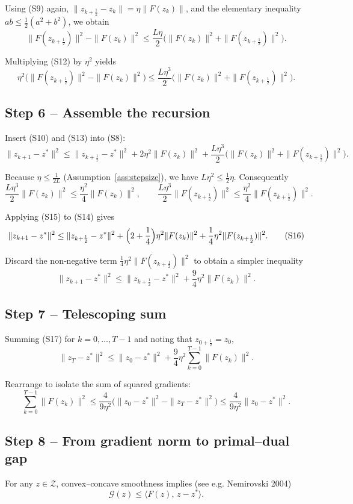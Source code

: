 \documentclass{article}
\begin{document}
Using (S9) again, $\|z_{k+\frac12}-z_{k}\|=\eta\|F(z_{k})\|$, and the elementary inequality
$ab\le\frac12(a^{2}+b^{2})$, we obtain
\[
\|F(z_{k+\frac12})\|^{2}-\|F(z_{k})\|^{2}
\le \frac{L\eta}{2}\bigl(\|F(z_{k})\|^{2}+\|F(z_{k+\frac12})\|^{2}\bigr).
\tag{S12}
\]

Multiplying (S12) by $\eta^{2}$ yields
\[
\eta^{2}\bigl(\|F(z_{k+\frac12})\|^{2}-\|F(z_{k})\|^{2}\bigr)
\le \frac{L\eta^{3}}{2}\bigl(\|F(z_{k})\|^{2}+\|F(z_{k+\frac12})\|^{2}\bigr).
\tag{S13}
\]

\subsection*{Step 6 – Assemble the recursion}
Insert (S10) and (S13) into (S8):
\[
\|z_{k+1}-z^{*}\|^{2}
\le \|z_{k+\frac12}-z^{*}\|^{2}
+2\eta^{2}\|F(z_{k})\|^{2}
+\frac{L\eta^{3}}{2}\bigl(\|F(z_{k})\|^{2}+\|F(z_{k+\frac12})\|^{2}\bigr).
\tag{S14}
\]

Because $\eta\le\frac{1}{2L}$ (Assumption~\ref{ass:stepsize}), we have $L\eta^{2}\le\frac12\eta$. Consequently
\[
\frac{L\eta^{3}}{2}\|F(z_{k})\|^{2}\le \frac{\eta^{2}}{4}\|F(z_{k})\|^{2},
\qquad
\frac{L\eta^{3}}{2}\|F(z_{k+\frac12})\|^{2}\le \frac{\eta^{2}}{4}\|F(z_{k+\frac12})\|^{2}.
\tag{S15}
\]

Applying (S15) to (S14) gives
\[
\|z_{k+1}-z^{*}\|^{2}
\le \|z_{k+\frac12}-z^{*}\|^{2}
+\Bigl(2+\frac14\Bigr)\eta^{2}\|F(z_{k})\|^{2}
+\frac14\eta^{2}\|F(z_{k+\frac12})\|^{2}.
\tag{S16}
\]

Discard the non‑negative term $\frac14\eta^{2}\|F(z_{k+\frac12})\|^{2}$ to obtain a simpler inequality
\[
\|z_{k+1}-z^{*}\|^{2}
\le \|z_{k+\frac12}-z^{*}\|^{2}
+\frac{9}{4}\eta^{2}\|F(z_{k})\|^{2}.
\tag{S17}
\]

\subsection*{Step 7 – Telescoping sum}
Summing (S17) for $k=0,\dots,T-1$ and noting that $z_{0+\frac12}=z_{0}$,
\[
\|z_{T}-z^{*}\|^{2}
\le \|z_{0}-z^{*}\|^{2}
+\frac{9}{4}\eta^{2}\sum_{k=0}^{T-1}\|F(z_{k})\|^{2}.
\tag{S18}
\]

Rearrange to isolate the sum of squared gradients:
\[
\sum_{k=0}^{T-1}\|F(z_{k})\|^{2}
\le \frac{4}{9\eta^{2}}\bigl(\|z_{0}-z^{*}\|^{2}-\|z_{T}-z^{*}\|^{2}\bigr)
\le \frac{4}{9\eta^{2}}\|z_{0}-z^{*}\|^{2}.
\tag{S19}
\]

\subsection*{Step 8 – From gradient norm to primal–dual gap}
For any $z\in\mathcal Z$, convex–concave smoothness implies (see e.g. Nemirovski 2004)
\[
\mathcal G(z)\le \langle F(z),\,z-z^{*}\rangle .
\tag{S20}
\]
\end{document}
